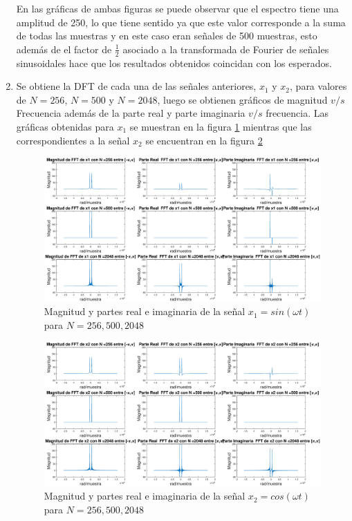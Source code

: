\begin{enumerate}
En las gráficas de ambas figuras se puede observar que el espectro tiene una amplitud de 250, lo que tiene sentido ya que este valor corresponde a la suma de todas las muestras y en este caso eran señales de 500 muestras, esto además de el factor de $\frac{1}{2}$ asociado a la transformada de Fourier de señales sinusoidales hace que los resultados obtenidos coincidan con los esperados.

\item Se obtiene la DFT de cada una de las señales anteriores, $x_1 $ y $x_2$,  para  valores de $N = 256$, $N = 500$ y $N = 2048$, luego se obtienen gráficos de magnitud $v/s$ Frecuencia además de la parte real y parte imaginaria $v/s$ frecuencia. Las gráficas obtenidas para $x_1$ se muestran en la figura \ref{x1} mientras que las correspondientes a la señal $x_2$ se encuentran en la figura \ref{x2}

\begin{figure}[H]
    \centering
    \includegraphics[scale = 0.3]{Figuras/p1_3-x1.eps}
    \caption{Magnitud y partes real e imaginaria de la señal $x_1 = sin(\omega t)$ para $N = 256,500,2048$}
    \label{x1}
\end{figure}

\begin{figure}[H]
    \centering
    \includegraphics[scale = 0.3]{Figuras/p1_3-x2.eps}
    \caption{Magnitud y partes real e imaginaria de la señal $x_2 = cos(\omega t)$ para $N = 256,500,2048$}
    \label{x2}
\end{figure}


\end{enumerate}
